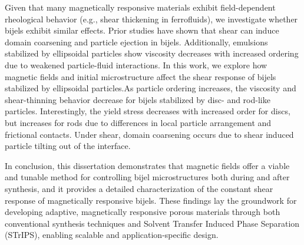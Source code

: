 \begin{front}
    Given that many magnetically responsive materials exhibit field-dependent rheological behavior (e.g., shear thickening in ferrofluids), 
    we investigate whether bijels exhibit similar effects. Prior studies have shown that shear can induce domain coarsening and particle 
    ejection in bijels. Additionally, emulsions stabilized by ellipsoidal particles show viscosity decreases with increased ordering due 
    to weakened particle-fluid interactions. In this work, we explore how magnetic fields and initial microstructure affect the shear 
    response of bijels stabilized by ellipsoidal particles.As particle ordering increases, the viscosity and shear-thinning behavior decrease for 
    bijels stabilized by disc- and rod-like particles. Interestingly, the yield stress decreases with increased order for discs, but increases for 
    rods due to differences in local particle arrangement and frictional contacts. Under shear, domain coarsening occurs due to shear induced particle 
    tilting out of the interface.
    
    In conclusion, this dissertation demonstrates that magnetic fields offer a viable and tunable method for controlling bijel microstructures both 
    during and after synthesis, and it provides a detailed characterization of the constant shear response of magnetically responsive bijels. These findings 
    lay the groundwork for developing adaptive, magnetically responsive porous materials through both conventional synthesis techniques and Solvent 
    Transfer Induced Phase Separation (STrIPS), enabling scalable and application-specific design.

\end{front}